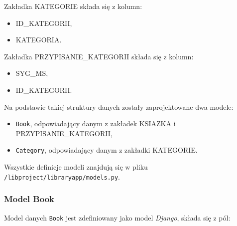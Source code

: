 \documentclass[twoside]{projektInzynierskiMS}
\begin{document}
Zakładka KATEGORIE składa się z kolumn: 
\begin{itemize}
	\item ID\_KATEGORII,
	\item KATEGORIA.
\end{itemize}
 
Zakładka PRZYPISANIE\_KATEGORII składa się z kolumn:

\begin{itemize}
	\item SYG\_MS,
	\item ID\_KATEGORII.
\end{itemize}
 

Na podstawie takiej struktury danych zostały zaprojektowane dwa modele:
\begin{itemize}
	\item \verb`Book`, odpowiadający danym z zakładek KSIAZKA i PRZYPISANIE\_KATEGORII,
	\item \verb`Category`, odpowiadający danym z zakładki KATEGORIE.
\end{itemize}

Wszystkie definicje modeli znajdują się w pliku \verb`/libproject/libraryapp/models.py`.

\subsubsection{Model Book}

Model danych \verb`Book` jest zdefiniowany jako model \textit{Django}, składa się z pól:
\end{document}
